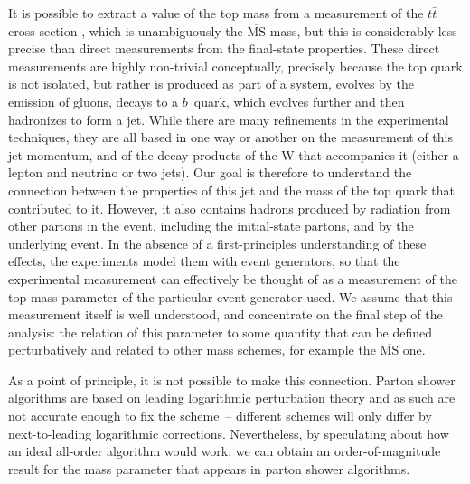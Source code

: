 It is possible to extract a value of the top mass from a measurement of
the $t\bar{t}$ cross section \cite{Abazov:2009ae,Langenfeld:2009wd},
which is unambiguously the $\overline{\mathrm{MS}}$ mass, but this is
considerably less precise than direct measurements from the final-state
properties.
These direct measurements are highly non-trivial conceptually,
precisely because the top quark is not isolated, but rather is produced
as part of a system, evolves by the emission of gluons, decays to a
$b$~quark, which evolves further and then hadronizes to form a jet.  While
there are many refinements in the experimental techniques, they are all
based in one way or another on the measurement of this jet momentum, and
of the decay products of the W that accompanies it (either a lepton and
neutrino or two jets).  Our goal is therefore to understand the
connection between the properties of this jet and the mass of the top
quark that contributed to it.  However, it also contains hadrons
produced by radiation from other partons in the event, including the
initial-state partons, and by the underlying event.  In the absence of a
first-principles understanding of these effects, the experiments model
them with event generators, so that the experimental measurement can
effectively be thought of as a measurement of the top mass parameter of
the particular event generator used.  We assume that this measurement
itself is well understood, and concentrate on the final step of the
analysis: the relation of this parameter to some quantity that can be
defined perturbatively and related to other mass schemes, for example
the $\overline{\mathrm{MS}}$ one.

As a point of principle, it is not possible to make this connection.
Parton shower algorithms are based on leading logarithmic perturbation
theory and as such are not accurate enough to fix the scheme~--
different schemes will only differ by next-to-leading logarithmic
corrections.  Nevertheless, by speculating about how an ideal all-order
algorithm would work, we can obtain an order-of-magnitude result for the
mass parameter that appears in parton shower algorithms.

